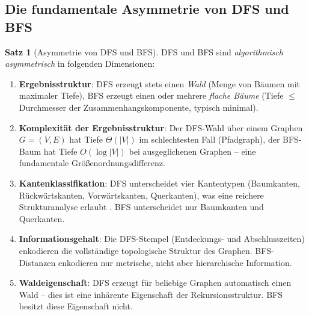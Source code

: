 ﻿\documentclass[12pt,a4paper]{article}
\theoremstyle{definition}
\newtheorem{theorem}{Satz}[section]
\theoremstyle{remark}
\begin{document}
\subsection{Die fundamentale Asymmetrie von DFS und BFS}

\begin{theorem}[Asymmetrie von DFS und BFS]
\label{thm:asymmetrie}
DFS und BFS sind \emph{algorithmisch asymmetrisch} in folgenden Dimensionen:
\begin{enumerate}[label=(\roman*)]
  \item \textbf{Ergebnisstruktur}: DFS erzeugt stets einen \emph{Wald}
        (Menge von Bäumen mit maximaler Tiefe), BFS erzeugt einen oder
        mehrere \emph{flache Bäume} (Tiefe $\leq$ Durchmesser der
        Zusammenhangskomponente, typisch minimal).
  \item \textbf{Komplexität der Ergebnisstruktur}: Der DFS-Wald über
        einem Graphen $G = (V, E)$ hat Tiefe $\Theta(|V|)$ im
        schlechtesten Fall (Pfadgraph), der BFS-Baum hat Tiefe
        $O(\log |V|)$ bei ausgeglichenen Graphen -- eine fundamentale
        Größenordnungsdifferenz.
  \item \textbf{Kantenklassifikation}: DFS unterscheidet vier Kantentypen
        (Baumkanten, Rückwärtskanten, Vorwärtskanten, Querkanten), was eine
        reichere Strukturanalyse erlaubt \cite{Cormen2009}. BFS unterscheidet
        nur Baumkanten und Querkanten.
  \item \textbf{Informationsgehalt}: Die DFS-Stempel (Entdeckungs- und
        Abschlusszeiten) enkodieren die vollständige topologische Struktur
        des Graphen. BFS-Distanzen enkodieren nur metrische, nicht aber
        hierarchische Information.
  \item \textbf{Waldeigenschaft}: DFS erzeugt für beliebige Graphen
        automatisch einen Wald -- dies ist eine inhärente Eigenschaft der
        Rekursionsstruktur. BFS besitzt diese Eigenschaft nicht.
\end{enumerate}
\end{theorem}
\end{document}

